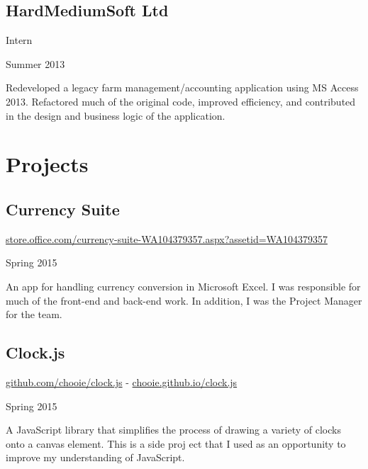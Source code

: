 \documentclass[a4paper]{article}
\begin{document}
\subsection*{HardMediumSoft Ltd}
\begin{minipage}[b]{0.5\textwidth}
  \flushleft
  Intern
\end{minipage}
\begin{minipage}[b]{0.5\textwidth}
  \flushright
  Summer 2013
\end{minipage}
Redeveloped a legacy farm management/accounting application using MS Access 2013. Refactored much of the original code, improved efficiency, and contributed in the design and business logic of the application.

\section*{Projects}
\subsection*{Currency Suite}
\begin{minipage}[b]{0.5\textwidth}
  \flushleft
  \href{https://store.office.com/currency-suite-WA104379357.aspx?assetid=WA104379357}{store.office.com/currency-suite-WA104379357.aspx?assetid=WA104379357}
\end{minipage}
\begin{minipage}[b]{0.5\textwidth}
  \flushright
  Spring 2015
\end{minipage}
An app for handling currency conversion in Microsoft  Excel. I was responsible for much of the front-end and back-end work. In addition, I was the Project Manager for the team.


\subsection*{Clock.js}
\begin{minipage}[b]{0.5\textwidth}
  \flushleft
  \href{https://github.com/chooie/clock.js}{github.com/chooie/clock.js} - \href {https://chooie.github.io/clock.js}{chooie.github.io/clock.js}
\end{minipage}
\begin{minipage}[b]{0.5\textwidth}
  \flushright
  Spring 2015
\end{minipage}
A JavaScript library that simplifies the process of drawing a variety of clocks onto a canvas element. This is a side proj
ect that I used as an opportunity to improve my understanding of JavaScript.
\end{document}
